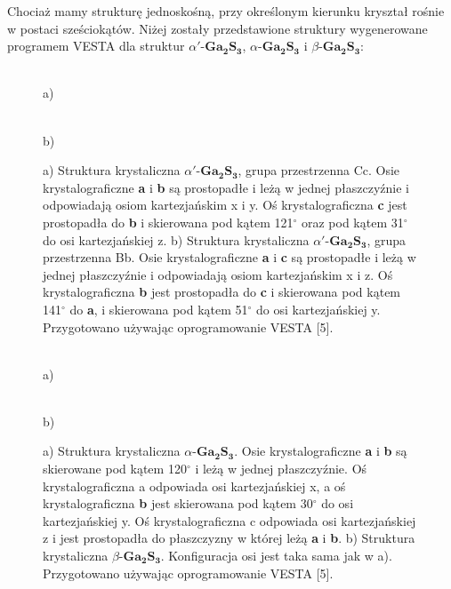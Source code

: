 Chociaż mamy strukturę jednoskośną, przy określonym kierunku kryształ rośnie w postaci sześciokątów. Niżej zostały przedstawione struktury wygenerowane programem VESTA dla struktur $\alpha'$-$\mathbf{Ga_{2}S_{3}}$, $\alpha$-$\mathbf{Ga_{2}S_{3}}$ i  $\beta$-$\mathbf{Ga_{2}S_{3}}$:

\begin{center}
	\begin{figure}[H]
		\begin{minipage}[h]{0.47\linewidth}
			 \\a)
		\end{minipage}
		\hfill
		\begin{minipage}[h]{0.47\linewidth}
			 \\b)
		\end{minipage}
		\caption{a) Struktura krystaliczna $\alpha'$-$\mathbf{Ga_{2}S_{3}}$, grupa przestrzenna Cc. Osie krystalograficzne \textbf{a} i \textbf{b} są prostopadłe i leżą w jednej płaszczyźnie i odpowiadają osiom kartezjańskim x i y. Oś krystalograficzna \textbf{c} jest prostopadła do \textbf{b} i skierowana pod kątem 121$^{\circ}$ oraz pod kątem 31$^{\circ}$ do osi kartezjańskiej z. b) Struktura krystaliczna $\alpha'$-$\mathbf{Ga_{2}S_{3}}$, grupa przestrzenna Bb. Osie krystalograficzne \textbf{a} i \textbf{c} są prostopadłe i leżą w jednej płaszczyźnie i odpowiadają osiom kartezjańskim x i z. Oś krystalograficzna \textbf{b} jest prostopadła do \textbf{c} i skierowana pod kątem 141$^{\circ}$ do \textbf{a}, i skierowana pod kątem 51$^{\circ}$ do osi kartezjańskiej y. Przygotowano używając oprogramowanie VESTA [5].}
	\end{figure}
\end{center}

\begin{center}
	\begin{figure}[H]
		\begin{minipage}[h]{0.47\linewidth}
			 \\a)
		\end{minipage}
		\hfill
		\begin{minipage}[h]{0.47\linewidth}
			 \\b)
		\end{minipage}
		\caption{a) Struktura krystaliczna $\alpha$-$\mathbf{Ga_{2}S_{3}}$. Osie krystalograficzne \textbf{a} i \textbf{b} są skierowane pod kątem 120$^{\circ}$ i leżą w jednej płaszczyźnie. Oś krystalograficzna a odpowiada osi kartezjańskiej x, a oś krystalograficzna \textbf{b} jest skierowana pod kątem 30$^{\circ}$ do osi kartezjańskiej y. Oś krystalograficzna c odpowiada osi kartezjańskiej z i jest prostopadła do płaszczyzny w której leżą \textbf{a} i \textbf{b}. b) Struktura krystaliczna $\beta$-$\mathbf{Ga_{2}S_{3}}$. Konfiguracja osi jest taka sama jak w a). Przygotowano używając oprogramowanie VESTA [5].}
	\end{figure}
\end{center}
	
